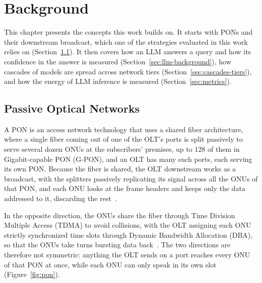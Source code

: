 \documentclass[cic,dipl,english]{infufrgs}
\begin{document}
\chapter{Background}
\label{chap:background}


This chapter presents the concepts this work builds on. It starts with PONs and their
downstream broadcast, which one of the strategies evaluated in this work relies on
(Section~\ref{sec:pon}). It then covers how an LLM answers a query and how its confidence
in the answer is measured (Section~\ref{sec:llm-background}), how cascades of models are
spread across network tiers (Section~\ref{sec:cascades-tiers}), and how the energy of LLM
inference is measured (Section~\ref{sec:metrics}).

\section{Passive Optical Networks}
\label{sec:pon}
A PON is an access network technology that uses a shared fiber architecture, where a
single fiber coming out of one of the OLT's ports is split passively to serve several
dozen ONUs at the subscribers' premises, up to 128 of them in Gigabit-capable PON
(G-PON), and an OLT has many such ports, each serving its own PON. Because the fiber is
shared, the OLT downstream works as a broadcast, with the splitters passively
replicating its signal across all the ONUs of that PON, and each ONU looks at the
frame headers and keeps only the data addressed to it, discarding the
rest~\cite{effenberger2007introduction}.

In the opposite direction, the ONUs share the fiber through Time Division Multiple
Access (TDMA) to avoid collisions, with the OLT assigning each ONU strictly synchronized
time slots through Dynamic Bandwidth Allocation (DBA), so that the ONUs take turns
bursting data back~\cite{effenberger2007introduction}. The two directions are therefore
not symmetric: anything the OLT sends on a port reaches every ONU of that PON at once,
while each ONU can only speak in its own slot (Figure~\ref{fig:pon}).
\end{document}
